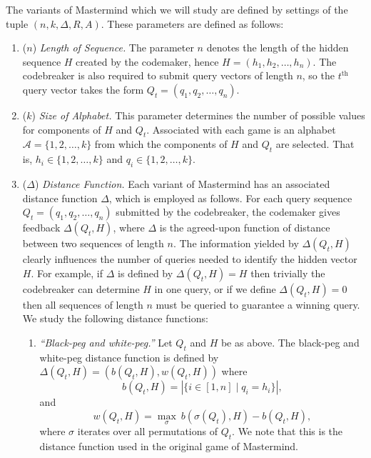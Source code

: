 \documentclass[12pt, a4paper]{article}
\newcommand{\nth}{^{\text{th}}}       %
\begin{document}
The variants of Mastermind which we will study are defined by settings of the tuple $(n, k, \Delta, R, A)$. These parameters are defined as follows:
\begin{enumerate}[label=(\roman*)]
	\item ($n$) \textit{Length of Sequence.} The parameter $n$ denotes the length of the hidden sequence $H$ created by the codemaker, hence $H = (h_1, h_2, \ldots, h_n)$. The codebreaker is also required to submit query vectors of length $n$, so the $t\nth$ query vector takes the form $Q_t = (q_1, q_2, \ldots, q_n)$.
	
	\item ($k$) \textit{Size of Alphabet.} This parameter determines the number of possible values for components of $H$ and $Q_t$. Associated with each game is an alphabet $\mathcal{A} = \{1,2,\ldots,k\}$ from which the components of $H$ and $Q_t$ are selected. That is, $h_i\in\{1,2,\ldots,k\}$ and $q_i\in\{1,2,\ldots,k\}$.
	
	\item($\Delta$) \textit{Distance Function.} Each variant of Mastermind has an associated distance function $\Delta$, which is employed as follows. For each query sequence $Q_t = (q_1, q_2, \ldots, q_n)$ submitted by the codebreaker, the codemaker gives feedback $\Delta(Q_t, H)$, where $\Delta$ is the agreed-upon function of distance between two sequences of length $n$. The information yielded by $\Delta(Q_t, H)$ clearly influences the number of queries needed to identify the hidden vector $H$. For example, if $\Delta$ is defined by $\Delta(Q_t, H) = H$ then trivially the codebreaker can determine $H$ in one query, or if we define $\Delta(Q_t, H) = 0$ then all sequences of length $n$ must be queried to guarantee a winning query. We study the following distance functions:
	\begin{enumerate}[label=\alph*.]
		\item\textit{``Black-peg and white-peg.''} Let $Q_t$ and $H$ be as above. The black-peg and white-peg distance function is defined by $\Delta(Q_t, H) = (b(Q_t, H), w(Q_t, H))$ where
		\begin{equation}\label{blackHitsDefinition}
			b(Q_t, H) = \left|\{i\in [1,n] \mid q_i = h_i\}\right|,
		\end{equation}
		and
		\begin{equation*}\label{whiteHitsDefinition}
			w(Q_t, H) = \max_{\sigma}~b(\sigma(Q_t), H) - b(Q_t, H),
		\end{equation*}
		where $\sigma$ iterates over all permutations of $Q_t$. We note that this is the distance function used in the original game of Mastermind.


\end{enumerate}
\end{enumerate}
\end{document}
